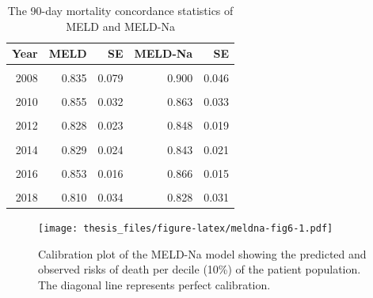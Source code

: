 \documentclass[11pt,english,]{book} %
\begin{document}
\linespread{1}

\begin{table}

\caption{\label{tab:meldna-tab2}The 90-day mortality concordance statistics of MELD and MELD-Na}
\centering
\begin{tabular}[t]{rrrrr}
\toprule
Year & MELD & SE & MELD-Na & SE\\
\midrule
\cellcolor{gray!6}{2007} & \cellcolor{gray!6}{0.866} & \cellcolor{gray!6}{0.087} & \cellcolor{gray!6}{0.946} & \cellcolor{gray!6}{0.036}\\
2008 & 0.835 & 0.079 & 0.900 & 0.046\\
\cellcolor{gray!6}{2009} & \cellcolor{gray!6}{0.922} & \cellcolor{gray!6}{0.026} & \cellcolor{gray!6}{0.933} & \cellcolor{gray!6}{0.024}\\
2010 & 0.855 & 0.032 & 0.863 & 0.033\\
\cellcolor{gray!6}{2011} & \cellcolor{gray!6}{0.776} & \cellcolor{gray!6}{0.049} & \cellcolor{gray!6}{0.804} & \cellcolor{gray!6}{0.041}\\
2012 & 0.828 & 0.023 & 0.848 & 0.019\\
\cellcolor{gray!6}{2013} & \cellcolor{gray!6}{0.843} & \cellcolor{gray!6}{0.023} & \cellcolor{gray!6}{0.846} & \cellcolor{gray!6}{0.022}\\
2014 & 0.829 & 0.024 & 0.843 & 0.021\\
\cellcolor{gray!6}{2015} & \cellcolor{gray!6}{0.821} & \cellcolor{gray!6}{0.021} & \cellcolor{gray!6}{0.824} & \cellcolor{gray!6}{0.021}\\
2016 & 0.853 & 0.016 & 0.866 & 0.015\\
\cellcolor{gray!6}{2017} & \cellcolor{gray!6}{0.814} & \cellcolor{gray!6}{0.026} & \cellcolor{gray!6}{0.843} & \cellcolor{gray!6}{0.019}\\
2018 & 0.810 & 0.034 & 0.828 & 0.031\\
\bottomrule
\end{tabular}
\end{table}

\linespread{1.213}

\begin{figure}
\centering
\texttt{[image: thesis\_files/figure-latex/meldna-fig6-1.pdf]}
\caption{\label{fig:meldna-fig6}Calibration plot of the MELD-Na model showing the predicted and observed risks of death per decile (10\%) of the patient population. The diagonal line represents perfect calibration.}
\end{figure}
\end{document}
